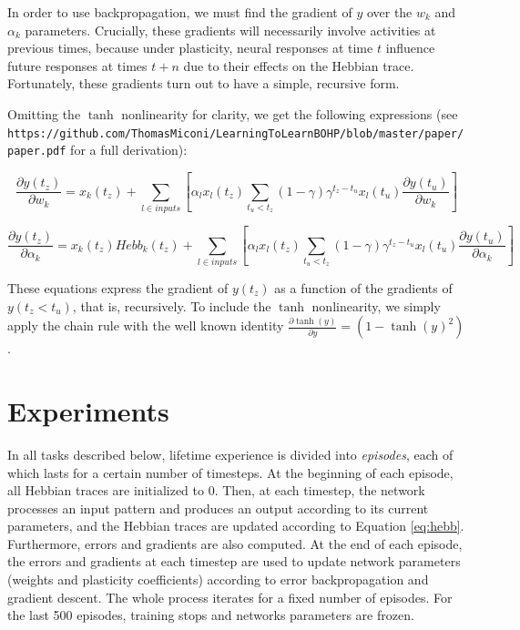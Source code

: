 \documentclass{article}
\begin{document}
In order to use backpropagation, we must find the gradient of $y$ over the $w_k$ and
$\alpha_k$ parameters. Crucially, these gradients will necessarily
involve activities at previous times, because under plasticity, neural responses at time $t$ influence future responses at times $t+n$ due to their effects on the Hebbian trace. 
Fortunately, these gradients turn out to
have a simple, recursive form. 

Omitting the $\tanh$ nonlinearity for clarity, we get the
following expressions (see \texttt{https://github.com/ThomasMiconi/LearningToLearnBOHP/blob/master/paper/paper.pdf} for a full derivation): 

\begin{equation}
\label{eq:gradw}
\frac{\partial y(t_z)}{\partial w_k} = x_k(t_z) + \sum_{l \in inputs}[\alpha_l
x_l(t_z) \sum_{t_u<t_z}(1-\gamma) \gamma^{t_z-t_u} x_l(t_u) \frac{\partial
y(t_u)}{\partial w_k}]
\end{equation}

\begin{equation}
\label{eq:gradalpha}
\frac{\partial y(t_z)}{\partial \alpha_k} = x_k(t_z) Hebb_k(t_z) + \sum_{l \in inputs}
[\alpha_l x_l(t_z) \sum_{t_u<t_z}(1-\gamma) \gamma^{t_z-t_u} x_l(t_u) \frac{\partial
y(t_u)}{\partial \alpha_k}]
\end{equation}

These equations express the gradient of $y(t_z)$ as a function of the gradients
of $y(t_z<t_u)$, that is, recursively. To include the $\tanh$ nonlinearity, we
simply apply the chain rule with the well known identity $\frac{\partial \tanh(y)}{\partial y} = (1
- \tanh(y)^2)$.


\section{Experiments}


In all tasks described below, lifetime experience is divided into
\emph{episodes}, each of which lasts for a certain number of timesteps. At the
beginning of each episode, all Hebbian traces are initialized to 0. Then,
at each timestep, the network processes an input pattern and produces an output
according to its current parameters, and the Hebbian traces are updated
according to Equation \ref{eq:hebb}. Furthermore, errors and gradients are also
computed. At the end of each episode, the errors and gradients at each timestep
are used to update network parameters (weights and plasticity coefficients)
according to error backpropagation and gradient descent. The whole process
iterates for a fixed number of episodes. For the last 500 episodes, training
stops and networks parameters are frozen. 
\end{document}
